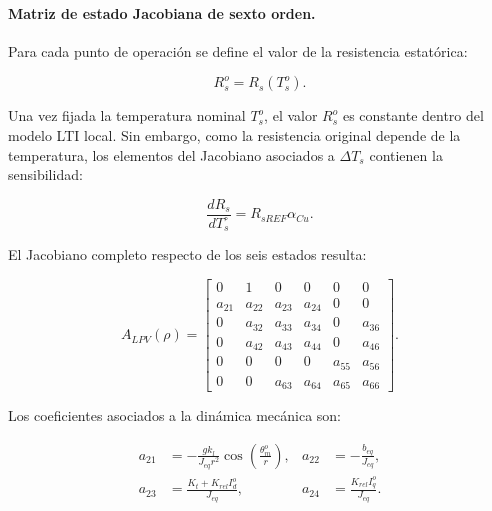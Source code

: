 \documentclass[10pt,a4paper]{article}
\begin{document}
\paragraph{Matriz de estado Jacobiana de sexto orden.}
Para cada punto de operación se define el valor de la resistencia estatórica:

\begin{equation}
	R_s^o=R_s(T_s^o).
	\label{eq:resistencia_punto_operacion}
\end{equation}

Una vez fijada la temperatura nominal $T_s^o$, el valor $R_s^o$ es constante dentro del modelo LTI local. Sin embargo, como la resistencia original depende de la temperatura, los elementos del Jacobiano asociados a $\Delta T_s$ contienen la sensibilidad:

\begin{equation}
	\frac{dR_s}{dT_s^{\circ}}
	=
	R_{sREF}\alpha_{Cu}.
	\label{eq:derivada_resistencia_temperatura}
\end{equation}

El Jacobiano completo respecto de los seis estados resulta:

\begin{equation}
	\boxed{
		A_{LPV}(\rho)=
		\begin{bmatrix}
			0      & 1      & 0      & 0      & 0      & 0\\[1mm]
			a_{21} & a_{22} & a_{23} & a_{24} & 0      & 0\\[1mm]
			0      & a_{32} & a_{33} & a_{34} & 0      & a_{36}\\[1mm]
			0      & a_{42} & a_{43} & a_{44} & 0      & a_{46}\\[1mm]
			0      & 0      & 0      & 0      & a_{55} & a_{56}\\[1mm]
			0      & 0      & a_{63} & a_{64} & a_{65} & a_{66}
		\end{bmatrix}.
	}
	\label{eq:matriz_a_lpv_6}
\end{equation}

Los coeficientes asociados a la dinámica mecánica son:

\begin{equation}
	\begin{aligned}
		a_{21}
		&=
		-\frac{gk_l}{J_{eq}r^2}
		\cos\left(\frac{\theta_m^o}{r}\right),
		&
		a_{22}
		&=
		-\frac{b_{eq}}{J_{eq}},\\[1mm]
		a_{23}
		&=
		\frac{K_t+K_{rel}I_d^o}{J_{eq}},
		&
		a_{24}
		&=
		\frac{K_{rel}I_q^o}{J_{eq}}.
	\end{aligned}
	\label{eq:coeficientes_mecanicos_lpv_6}
\end{equation}
\end{document}
